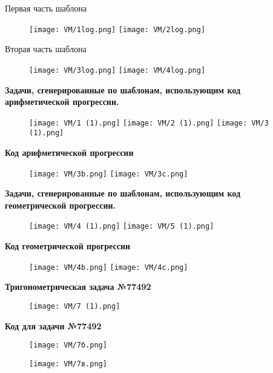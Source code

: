 \newpage

\quad Первая часть шаблона
	
\begin{figure}[h]
		\centering
		\texttt{[image: VM/1log.png]}
		\texttt{[image: VM/2log.png]}
\end{figure}

\newpage

\quad Вторая часть шаблона

\begin{figure}[h]
		\centering
		\texttt{[image: VM/3log.png]}
		\texttt{[image: VM/4log.png]}
\end{figure}

\quad \textbf{Задачи, сгенерированные по шаблонам, использующим код 
\\ арифметической прогрессии.}
	\begin{figure}[h]
		\centering
		\texttt{[image: VM/1 (1).png]}
		\texttt{[image: VM/2 (1).png]}
		\texttt{[image: VM/3 (1).png]}
	\end{figure}
	
\newpage

\quad \textbf{Код арифметической прогрессии}

	\begin{figure}[h]
		\centering
		\texttt{[image: VM/3b.png]}
		\texttt{[image: VM/3c.png]}
	\end{figure}

\quad \textbf{Задачи, сгенерированные по шаблонам, использующим код 
\\геометрической прогрессии.}

	\begin{figure}[h]
		\centering
		\texttt{[image: VM/4 (1).png]}
		\texttt{[image: VM/5 (1).png]}
	\end{figure}
	
\quad \textbf{Код геометрической прогрессии}

\newpage

\begin{figure}[h]
		\centering
		\texttt{[image: VM/4b.png]}
		\texttt{[image: VM/4c.png]}
	\end{figure}
	
\newpage

\quad \textbf{Тригонометрическая задача №77492}

	\begin{figure}[h]
		\centering
		\texttt{[image: VM/7 (1).png]}
	\end{figure}

\quad \textbf{Код для задачи №77492}

\begin{figure}[h]
		\centering
		\texttt{[image: VM/7б.png]}
\end{figure}
			
\begin{figure}[h]
		\centering
		\texttt{[image: VM/7в.png]}
\end{figure}